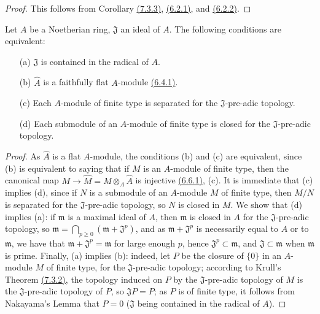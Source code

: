 \begin{proof}
\label{proof-cor-0.7.3.4}
This follows from Corollary \hyperref[cor-0.7.3.3]{(7.3.3)}, \hyperref[env-0.6.2.1]{(6.2.1)},
and \hyperref[env-0.6.2.2]{(6.2.2)}.
\end{proof}

\begin{cor}[7.3.5]
\label{cor-0.7.3.5}
Let $A$ be a Noetherian ring, $\mathfrak{J}$ an ideal of $A$. The following conditions are
equivalent:
\begin{itemize}
  \item[{\rm(a)}] $\mathfrak{J}$ is contained in the radical of $A$.
  \item[{\rm(b)}] $\widehat{A}$ is a faithfully flat $A$-module \hyperref[env-0.6.4.1]{(6.4.1)}.
  \item[{\rm(c)}] Each $A$-module of finite type is separated for the $\mathfrak{J}$-pre-adic topology.
  \item[{\rm(d)}] Each submodule of an $A$-module of finite type is closed for the
    $\mathfrak{J}$-pre-adic topology.
\end{itemize}
\end{cor}

\begin{proof}
\label{proof-cor-0.7.3.5}
As $\widehat{A}$ is a flat $A$-module, the conditions (b) and (c) are equivalent, since
(b) is equivalent to saying that if $M$ is an $A$-module of finite type, then the canonical
map $M\to\widehat{M}=M\otimes_A\widehat{A}$ is injective \hyperref[env-0.6.6.1]{(6.6.1)}, (c).
It is immediate that (c) implies (d), since if $N$ is a submodule of an $A$-module $M$ of
finite type, then $M/N$ is separated for the $\mathfrak{J}$-pre-adic topology, so $N$ is
closed in $M$. We show that (d) implies (a): if $\mathfrak{m}$ is a maximal ideal of $A$,
then $\mathfrak{m}$ is closed in $A$ for the $\mathfrak{J}$-pre-adic topology, so
$\mathfrak{m}=\bigcap_{p\geqslant 0}(\mathfrak{m}+\mathfrak{J}^p)$, and as
$\mathfrak{m}+\mathfrak{J}^p$ is necessarily equal to $A$ or to $\mathfrak{m}$, we have that
$\mathfrak{m}+\mathfrak{J}^p=\mathfrak{m}$ for large enough $p$,
hence $\mathfrak{J}^p\subset\mathfrak{m}$, and $\mathfrak{J}\subset\mathfrak{m}$ when
$\mathfrak{m}$ is prime. Finally, (a) implies (b): indeed, let $P$ be the closure of $\{0\}$
in an $A$-module $M$ of finite type, for the $\mathfrak{J}$-pre-adic topology; according to
Krull's Theorem \hyperref[thm-0.7.3.2]{(7.3.2)}, the topology induced on $P$ by the
$\mathfrak{J}$-pre-adic topology of $M$ is the $\mathfrak{J}$-pre-adic topology of $P$,
so $\mathfrak{J}P=P$; as $P$ is of finite type, it follows from Nakayama's Lemma that
$P=0$ ($\mathfrak{J}$ being contained in the radical of $A$).
\end{proof}

